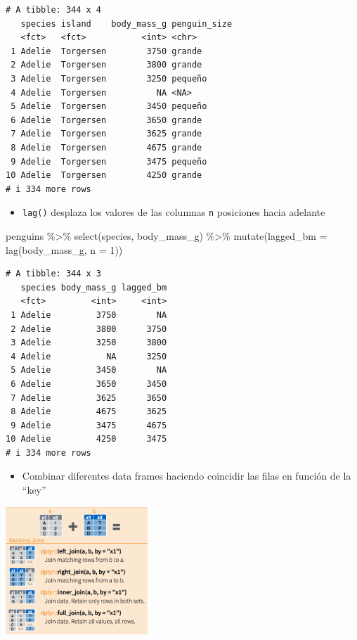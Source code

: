\documentclass[
  letterpaper,
  DIV=11,
  numbers=noendperiod]{scrreprt}
\newenvironment{Shaded}{\begin{snugshade}}{\end{snugshade}}
\newcommand{\AttributeTok}[1]{\textcolor[rgb]{0.40,0.45,0.13}{#1}}
\newcommand{\DecValTok}[1]{\textcolor[rgb]{0.68,0.00,0.00}{#1}}
\newcommand{\FunctionTok}[1]{\textcolor[rgb]{0.28,0.35,0.67}{#1}}
\newcommand{\NormalTok}[1]{\textcolor[rgb]{0.00,0.23,0.31}{#1}}
\newcommand{\SpecialCharTok}[1]{\textcolor[rgb]{0.37,0.37,0.37}{#1}}
\providecommand{\tightlist}{%
  \setlength{\itemsep}{0pt}\setlength{\parskip}{0pt}}\usepackage{longtable,booktabs,array}
\begin{document}
\begin{verbatim}
# A tibble: 344 x 4
   species island    body_mass_g penguin_size
   <fct>   <fct>           <int> <chr>       
 1 Adelie  Torgersen        3750 grande      
 2 Adelie  Torgersen        3800 grande      
 3 Adelie  Torgersen        3250 pequeño     
 4 Adelie  Torgersen          NA <NA>        
 5 Adelie  Torgersen        3450 pequeño     
 6 Adelie  Torgersen        3650 grande      
 7 Adelie  Torgersen        3625 grande      
 8 Adelie  Torgersen        4675 grande      
 9 Adelie  Torgersen        3475 pequeño     
10 Adelie  Torgersen        4250 grande      
# i 334 more rows
\end{verbatim}

\begin{itemize}
\tightlist
\item
  \texttt{lag()} desplaza los valores de las columnas \texttt{n}
  posiciones hacia adelante
\end{itemize}

\begin{Shaded}
\begin{Highlighting}[]
\NormalTok{penguins }\SpecialCharTok{\%\textgreater{}\%} \FunctionTok{select}\NormalTok{(species, body\_mass\_g) }\SpecialCharTok{\%\textgreater{}\%} 
  \FunctionTok{mutate}\NormalTok{(}\AttributeTok{lagged\_bm =} \FunctionTok{lag}\NormalTok{(body\_mass\_g, }\AttributeTok{n =} \DecValTok{1}\NormalTok{))}
\end{Highlighting}
\end{Shaded}

\begin{verbatim}
# A tibble: 344 x 3
   species body_mass_g lagged_bm
   <fct>         <int>     <int>
 1 Adelie         3750        NA
 2 Adelie         3800      3750
 3 Adelie         3250      3800
 4 Adelie           NA      3250
 5 Adelie         3450        NA
 6 Adelie         3650      3450
 7 Adelie         3625      3650
 8 Adelie         4675      3625
 9 Adelie         3475      4675
10 Adelie         4250      3475
# i 334 more rows
\end{verbatim}

\begin{itemize}
\tightlist
\item
  Combinar diferentes data frames haciendo coincidir las filas en
  función de la ``key''
\end{itemize}

\begin{center}
\includegraphics[width=0.4\textwidth,height=\textheight]{Figuras/combinar_tablas.png}
\end{center}
\end{document}
